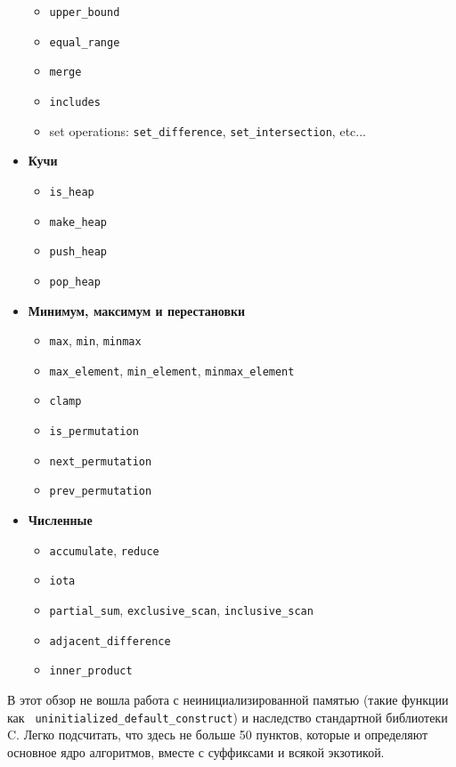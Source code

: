 \documentclass[a4paper,12pt,oneside]{article}
\begin{document}
\begin{itemize}
\begin{itemize}
\item \lstinline!upper_bound!
\item \lstinline!equal_range!
\item \lstinline!merge!
\item \lstinline!includes!
\item set operations: \lstinline!set_difference!, \lstinline!set_intersection!, etc...
\end{itemize}
\item \textbf{Кучи}
\begin{itemize}
\item \lstinline!is_heap!
\item \lstinline!make_heap!
\item \lstinline!push_heap!
\item \lstinline!pop_heap!
\end{itemize}
\item \textbf{Минимум, максимум и перестановки}
\begin{itemize}
\item \lstinline!max!, \lstinline!min!, \lstinline!minmax!
\item \lstinline!max_element!, \lstinline!min_element!, \lstinline!minmax_element!
\item \lstinline!clamp!
\item \lstinline!is_permutation!
\item \lstinline!next_permutation!
\item \lstinline!prev_permutation!
\end{itemize}
\item \textbf{Численные}
\begin{itemize}
\item \lstinline!accumulate!, \lstinline!reduce!
\item \lstinline!iota!
\item \lstinline!partial_sum!, \lstinline!exclusive_scan!, \lstinline!inclusive_scan!
\item \lstinline!adjacent_difference!
\item \lstinline!inner_product!
\end{itemize}
\end{itemize}

В этот обзор не вошла работа с неинициализированной памятью (такие функции как \lstinline! uninitialized_default_construct!) и наследство стандартной библиотеки C. Легко подсчитать, что здесь не больше 50 пунктов, которые и определяют основное ядро алгоритмов, вместе с суффиксами и всякой экзотикой.
\end{document}
